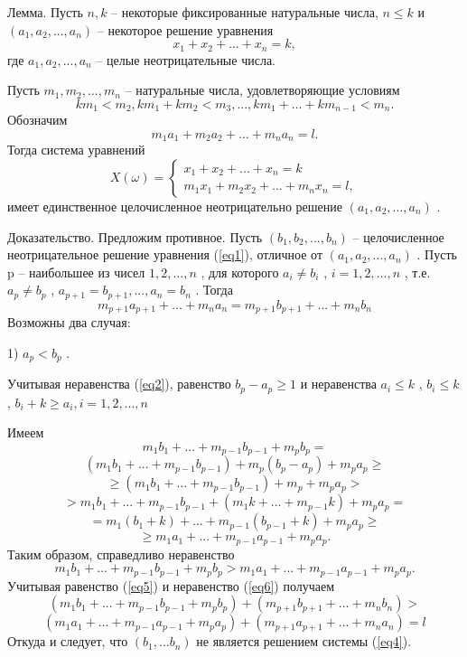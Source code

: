 {{{{{ Лемма. Пусть }{ $n,k$}{  -- некоторые фиксированные
натуральные числа, }$n\leq k${  и }$(a_{1},a_{2},...,a_{n})${
-- некоторое решение уравнения}
\begin{equation}
\label{eq1}
x_{1}+x_{2}+...+x_{n}=k,
\end{equation}
{ где }$a_{1},a_{2},...,a_{n}${  -- целые неотрицательные числа.}

{ Пусть }$m_{1},m_{2},...,m_{n}${   -- натуральные числа,
удовлетворяющие условиям}
\begin{equation}
\label{eq2}
km_{1}<m_{2}, km_{1}+km_{2}<m_{3},...,km_{1}+...+km_{n-1}<m_{n}.
\end{equation}
{ Обозначим}
\begin{equation}
\label{eq3}
m_{1}a_{1}+m_{2}a_{2}+...+m_{n}a_{n}=l.
\end{equation}
{ Тогда система уравнений}
\begin{equation}
\label{eq4}
X(\omega) =
 \begin{cases}
   x_{1}+x_{2}+...+x_{n}=k\\
   m_{1}x_{1}+m_{2}x_{2}+...+m_{n}x_{n}=l ,
 \end{cases}
\end{equation}
имеет единственное целочисленное неотрицательно решение $(a_{1},a_{2},...,a_{n})$ .

{ Доказательство. Предложим противное. Пусть $(b_{1},b_{2},...,b_{n})$   -- целочисленное неотрицательное решение уравнения (\ref{eq1}),
отличное от }$(a_{1},a_{2},...,a_{n})${ . Пусть p -- наибольшее из чисел
}$1,2,...,n${ , для которого }$a_{i}\neq b_{i}${ ,
}$i=1,2,...,n${ , т.е. }$a_{p}\neq b_{p}${ , }$a_{p+1}=b_{p+1},...,a_{n}=b_{n}${ . Тогда}
\begin{equation}
\label{eq5}
m_{p+1}a_{p+1}+...+m_{n}a_{n}=m_{p+1}b_{p+1}+...+m_{n}b_{n}
\end{equation}
{ Возможны два случая:}

{ 1) }$a_{p}<b_{p}${ .}

{ Учитывая неравенства (\ref{eq2}), равенство }$b_{p}-a_{p}\geq 1${  и
неравенства }$a_{i}\leq k${ , }$b_{i}\leq k${ ,
}$b_{i}+k\geq a_{i}, i=1,2,...,n$

{ Имеем}
\[
m_{1}b_{1}+...+m_{p-1}b_{p-1}+m_{p}b_{p}=
\]
\[
(m_{1}b_{1}+...+m_{p-1}b_{p-1})+
m_{p}(b_{p}-a_{p})+m_{p}a_{p} \geq
\]
\[
\geq(m_{1}b_{1}+...+m_{p-1}b_{p-1})+m_{p}+m_{p}a_{p}>
\]
\[
>m_{1}b_{1}+...+m_{p-1}b_{p-1}+(m_{1}k+...+m_{p-1}k)+m_{p}a_{p}=
\]
\[
=m_{1}(b_{1}+k)+...+m_{p-1}(b_{p-1}+k)+m_{p}a_{p}\geq
\]
\[
\geq m_{1}a_{1}+...+m_{p-1}a_{p-1}+m_{p}a_{p}.
\]
{ Таким образом, справедливо неравенство}
\begin{equation}
\label{eq6}
m_{1}b_{1}+...+m_{p-1}b_{p-1}+m_{p}b_{p}>m_{1}a_{1}+...+m_{p-1}a_{p-1}+m_{p}a_{p}.
\end{equation}
{ Учитывая равенство (\ref{eq5}) и неравенство (\ref{eq6}) получаем}
\[
(m_{1}b_{1}+...+m_{p-1}b_{p-1}+m_{p}b_{p})+(m_{p+1}b_{p+1}+...+m_{n}b_{n})>
\]
\[
(m_{1}a_{1}+...+m_{p-1}a_{p-1}+m_{p}a_{p})+(m_{p+1}a_{p+1}+...+m_{n}a_{n})=l
\]
{ Откуда и следует, что } $ (b_{1},...b_{n})${   не является
решением системы (\ref{eq4}).}

}}}}
